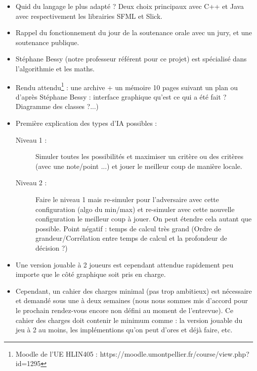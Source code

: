 \documentclass[11pt,a4paper]{article}
\begin{document}
\begin{itemize}[itemsep=5pt]

\item Quid du langage le plus adapté ? Deux choix principaux avec C++ et Java avec respectivement les librairies SFML et Slick.

\item Rappel du fonctionnement du jour de la soutenance orale avec un jury, et une soutenance publique.

\item Stéphane Bessy (notre professeur référent pour ce projet) est spécialisé dans l'algorithmie et les maths.

\item Rendu attendu\footnote{Moodle de l'UE HLIN405 : https://moodle.umontpellier.fr/course/view.php?id=1295} : une archive + un mémoire 10 pages suivant un plan ou d'après Stéphane Bessy : interface graphique qu'est ce qui a été fait ? Diagramme des classes ?...)

\item Première explication des types d'IA possibles : 

\begin{description}
    \item[Niveau 1 :] Simuler toutes les possibilités et maximiser un critère ou des critères (avec une note/point ...) et jouer le meilleur coup de manière locale.
    \item[Niveau 2 :] Faire le niveau 1 mais re-simuler pour l'adversaire avec cette configuration (algo du min/max) et re-simuler avec cette nouvelle configuration le meilleur coup à jouer. On peut étendre cela autant que possible. Point négatif : temps de calcul très grand (Ordre de grandeur/Corrélation entre temps de calcul et la profondeur de décision ?)
\end{description}
 
\item Une version jouable à 2 joueurs est cependant attendue rapidement peu importe que le côté graphique soit pris en charge.
 
\item Cependant, un cahier des charges minimal (pas trop ambitieux) est nécessaire et demandé sous une à deux semaines (nous nous sommes mis d'accord pour le prochain rendez-vous encore non défini au moment de l'entrevue). Ce cahier des charges doit contenir le minimum comme : la version jouable du jeu à 2 au moins, les implémentions qu'on peut d'ores et déjà faire, etc.


\end{itemize}
\end{document}
